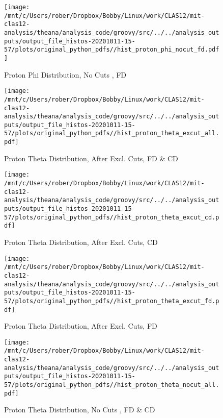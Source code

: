 \documentclass{article}
\begin{document}
\begin{landscape}
    \begin{figure}[h]
        \centering

        \texttt{[image: /mnt/c/Users/rober/Dropbox/Bobby/Linux/work/CLAS12/mit-clas12-analysis/theana/analysis\_code/groovy/src/../../analysis\_outputs/output\_file\_histos-20201011-15-57/plots/original\_python\_pdfs//hist\_proton\_phi\_nocut\_fd.pdf]}
        \captionsetup{textformat=empty,labelformat=blank}
        \caption{Proton Phi Distribution, No Cuts , FD}
    \end{figure}
    \clearpage
    
    \begin{figure}[h]
        \centering

        \texttt{[image: /mnt/c/Users/rober/Dropbox/Bobby/Linux/work/CLAS12/mit-clas12-analysis/theana/analysis\_code/groovy/src/../../analysis\_outputs/output\_file\_histos-20201011-15-57/plots/original\_python\_pdfs//hist\_proton\_theta\_excut\_all.pdf]}
        \captionsetup{textformat=empty,labelformat=blank}
        \caption{Proton Theta Distribution, After Excl. Cuts, FD \& CD}
    \end{figure}
    \clearpage
    
    \begin{figure}[h]
        \centering

        \texttt{[image: /mnt/c/Users/rober/Dropbox/Bobby/Linux/work/CLAS12/mit-clas12-analysis/theana/analysis\_code/groovy/src/../../analysis\_outputs/output\_file\_histos-20201011-15-57/plots/original\_python\_pdfs//hist\_proton\_theta\_excut\_cd.pdf]}
        \captionsetup{textformat=empty,labelformat=blank}
        \caption{Proton Theta Distribution, After Excl. Cuts, CD}
    \end{figure}
    \clearpage
    
    \begin{figure}[h]
        \centering

        \texttt{[image: /mnt/c/Users/rober/Dropbox/Bobby/Linux/work/CLAS12/mit-clas12-analysis/theana/analysis\_code/groovy/src/../../analysis\_outputs/output\_file\_histos-20201011-15-57/plots/original\_python\_pdfs//hist\_proton\_theta\_excut\_fd.pdf]}
        \captionsetup{textformat=empty,labelformat=blank}
        \caption{Proton Theta Distribution, After Excl. Cuts, FD}
    \end{figure}
    \clearpage
    
    \begin{figure}[h]
        \centering

        \texttt{[image: /mnt/c/Users/rober/Dropbox/Bobby/Linux/work/CLAS12/mit-clas12-analysis/theana/analysis\_code/groovy/src/../../analysis\_outputs/output\_file\_histos-20201011-15-57/plots/original\_python\_pdfs//hist\_proton\_theta\_nocut\_all.pdf]}
        \captionsetup{textformat=empty,labelformat=blank}
        \caption{Proton Theta Distribution, No Cuts , FD \& CD}
    \end{figure}
    \clearpage
    

\end{landscape}
\end{document}
